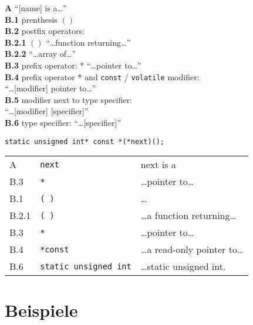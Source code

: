 \begin{tabbing}
\textbf{A} \=\enquote{[name] is a\dots}\\
  \>\textbf{B.1} \=prenthesis {\color{red}$( )$}\\
  \>\textbf{B.2} \>postfix operators:\\
  \>    \>\textbf{B.2.1} \={\color{red}$( )$}    \=\enquote{\dots function returning\dots}\\
  \>    \>\textbf{B.2.2} \>{\color{red}$[ ]$} \>\enquote{\dots array of\dots}\\
  \>\textbf{B.3} \>prefix operator: {\color{red}*} \enquote{\dots pointer to\dots}\\
  \>\textbf{B.4} \>prefix operator {\color{red}*} and {\color{red}\texttt{const} / \texttt{volatile}} modifier:\\
  \>    \>\enquote{\dots [modifier] pointer to\dots}\\
  \>\textbf{B.5}  modifier next to type specifier:\\
  \>    \>\enquote{\dots [modifier] [specifier]}\\
  \>\textbf{B.6} \>type specifier: \enquote{\dots [specifier]}
\end{tabbing}

\texttt{static unsigned int* const *(*next)();}

\begin{table}[htp]
    \centering
    \begin{tabular}{lll}
      A     & \texttt{next}                & next is a                     \\
      B.3   & \texttt{*}                   & \dots pointer to\dots           \\
      B.1   & \texttt{( )}                 & \dots                           \\
      B.2.1 & \texttt{( )}                 & \dots a function returning\dots   \\
      B.3   & \texttt{*}                   & \dots pointer to\dots             \\
      B.4   & \texttt{*const}              & \dots a read-only pointer to\dots \\
      B.6   & \texttt{static unsigned int} & \dots static unsigned int.      \\
    \end{tabular}
\end{table}

\section{Beispiele}
